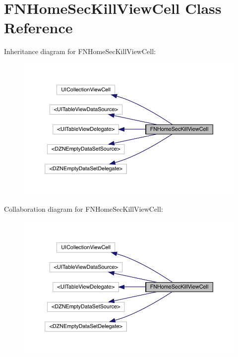 \hypertarget{interface_f_n_home_sec_kill_view_cell}{}\section{F\+N\+Home\+Sec\+Kill\+View\+Cell Class Reference}
\label{interface_f_n_home_sec_kill_view_cell}


Inheritance diagram for F\+N\+Home\+Sec\+Kill\+View\+Cell\+:\nopagebreak
\begin{figure}[H]
\begin{center}
\leavevmode
\includegraphics[width=350pt]{interface_f_n_home_sec_kill_view_cell__inherit__graph}
\end{center}
\end{figure}


Collaboration diagram for F\+N\+Home\+Sec\+Kill\+View\+Cell\+:\nopagebreak
\begin{figure}[H]
\begin{center}
\leavevmode
\includegraphics[width=350pt]{interface_f_n_home_sec_kill_view_cell__coll__graph}
\end{center}
\end{figure}
